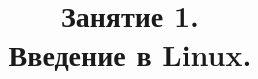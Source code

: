 

\title[SaM Solutions. Linux QA Training]
{
  Занятие 1.\\
  Введение в Linux.
}



\begin{frame}
  \titlepage
\end{frame}


